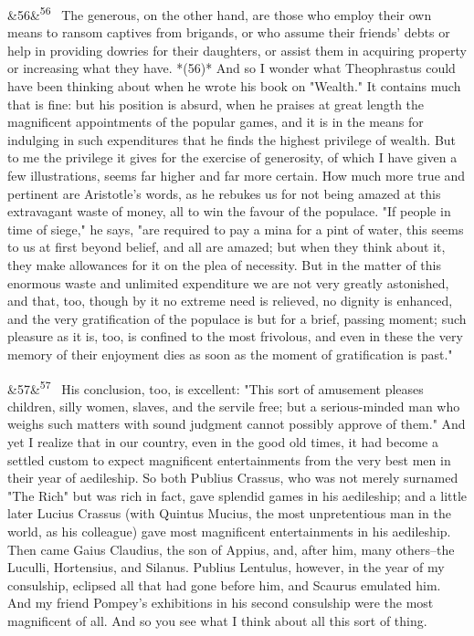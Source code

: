 \documentclass[12pt]{article}
\newcommand{\para}[1][]{\par\noindent\ifx&#1&\else\textsuperscript{\footnotesize #1}~\fi}
\begin{document}
\para[56] The generous, on the other hand, are those who employ their own means to ransom captives from brigands, or who assume their friends' debts or help in providing dowries for their daughters, or assist them in acquiring property or increasing what they have. *(56)* And so I wonder what Theophrastus could have been thinking about when he wrote his book on "Wealth." It contains much that is fine: but his position is absurd, when he praises at great length the magnificent appointments of the popular games, and it is in the means for indulging in such expenditures that he finds the highest privilege of wealth. But to me the privilege it gives for the exercise of generosity, of which I have given a few illustrations, seems far higher and far more certain. How much more true and pertinent are Aristotle's words, as he rebukes us for not being amazed at this extravagant waste of money, all to win the favour of the populace. "If people in time of siege," he says, "are required to pay a mina for a pint of water, this seems to us at first beyond belief, and all are amazed; but when they think about it, they make allowances for it on the plea of necessity. But in the matter of this enormous waste and unlimited expenditure we are not very greatly astonished, and that, too, though by it no extreme need is relieved, no dignity is enhanced, and the very gratification of the populace is but for a brief, passing moment; such pleasure as it is, too, is confined to the most frivolous, and even in these the very memory of their enjoyment dies as soon as the moment of gratification is past."

\para[57] His conclusion, too, is excellent: "This sort of amusement pleases children, silly women, slaves, and the servile free; but a serious-minded man who weighs such matters with sound judgment cannot possibly approve of them." And yet I realize that in our country, even in the good old times, it had become a settled custom to expect magnificent entertainments from the very best men in their year of aedileship. So both Publius Crassus, who was not merely surnamed "The Rich" but was rich in fact, gave splendid games in his aedileship; and a little later Lucius Crassus (with Quintus Mucius, the most unpretentious man in the world, as his colleague) gave most magnificent entertainments in his aedileship. Then came Gaius Claudius, the son of Appius, and, after him, many others--the Luculli, Hortensius, and Silanus. Publius Lentulus, however, in the year of my consulship, eclipsed all that had gone before him, and Scaurus emulated him. And my friend Pompey's exhibitions in his second consulship were the most magnificent of all. And so you see what I think about all this sort of thing.
\end{document}
